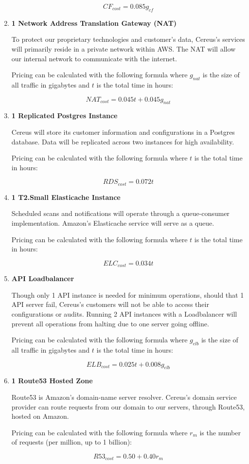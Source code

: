 \begin{enumerate}[\indent {}]
\[ CF_{cost} = 0.085g_{cf} \]

\item \textbf{1 Network Address Translation Gateway (NAT)}

To protect our proprietary technologies and customer's data, Cereus's services will primarily reside in a private network within AWS. The NAT will allow our internal network to communicate with the internet. 

Pricing can be calculated with the following formula where \( g_{nat} \) is the size of all traffic in gigabytes and \( t \) is the total time in hours:

\[ NAT_{cost} = 0.045t + 0.045g_{nat} \]

\item \textbf{1 Replicated Postgres Instance}

Cereus will store its customer information and configurations in a Postgres database. Data will be replicated across two instances for high availability.

Pricing can be calculated with the following formula where \( t \) is the total time in hours:

\[ RDS_{cost} = 0.072t \]

\item \textbf{1 T2.Small Elasticache Instance}

Scheduled scans and notifications will operate through a queue-consumer implementation. Amazon's Elasticache service will serve as a queue.

Pricing can be calculated with the following formula where \( t \) is the total time in hours:

\[ ELC_{cost} = 0.034t \]

\item \textbf{API Loadbalancer}

Though only 1 API instance is needed for minimum operations, should that 1 API server fail, Cereus's customers will not be able to access their configurations or audits. Running 2 API instances with a Loadbalancer will prevent all operations from halting due to one server going offline.

Pricing can be calculated with the following formula where \( g_{elb} \) is the size of all traffic in gigabytes and \( t \) is the total time in hours:

\[ ELB_{cost} = 0.025t + 0.008g_{elb} \]

\item \textbf{1 Route53 Hosted Zone}

Route53 is Amazon's domain-name server resolver. Cereus's domain service provider can route requests from our domain to our servers, through Route53, hosted on Amazon.

Pricing can be calculated with the following formula where \( r_{m} \) is the number of requests (per million, up to 1 billion):

\[ R53_{cost} = 0.50 + 0.40r_{m} \]

\end{enumerate}




